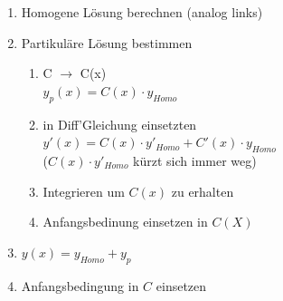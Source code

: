 \documentclass[6pt]{article}
\begin{document}
\begin{multicols*}{3}
	\vspace{-5mm}
	\begin{enumerate}[label=(\roman*), itemsep=2pt, parsep=3pt ]
		\item Homogene L{\"o}sung berechnen (analog links)
		\item Partikul{\"a}re L{\"o}sung bestimmen 
			\vspace{-2mm}
			\begin{enumerate}[itemsep=1pt, parsep=2pt]
				\item 	C $\rightarrow$ C(x) \vspace{0mm}\\
							$y_p(x) = C(x) \cdot  y_{Homo}$
				\item 	in Diff'Gleichung einsetzten \vspace{1mm}\\
							$y'(x) = C(x) \cdot  y'_{Homo} + C'(x) \cdot  y_{Homo}$ \vspace{1mm}\\
							($C(x) \cdot  y'_{Homo}$ k{\"u}rzt sich immer weg)
				\item Integrieren um $C(x)$ zu erhalten
				\item Anfangsbedinung einsetzen in $C(X)$		
			\end{enumerate}
			\vspace{-2mm}
		\item $y(x) = y_{Homo} + y_p$
		\item Anfangsbedingung in $C$ einsetzen
	\end{enumerate}
	

\end{multicols*}
\end{document}
